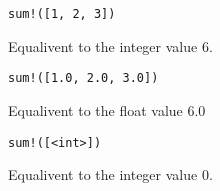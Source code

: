 {{		\begin{itemize}
		{
			\item[] \lstinline[language=MAIA, columns=fixed]@sum!([1, 2, 3])@
			
				Equalivent to the integer value 6.
			
			\item[] \lstinline[language=MAIA, columns=fixed]@sum!([1.0, 2.0, 3.0])@
			
				Equalivent to the float value 6.0
			
			\item[] \lstinline[language=MAIA, columns=fixed]@sum!([<int>])@
			
				Equalivent to the integer value 0.
		}
		\end{itemize}
	}
}






















